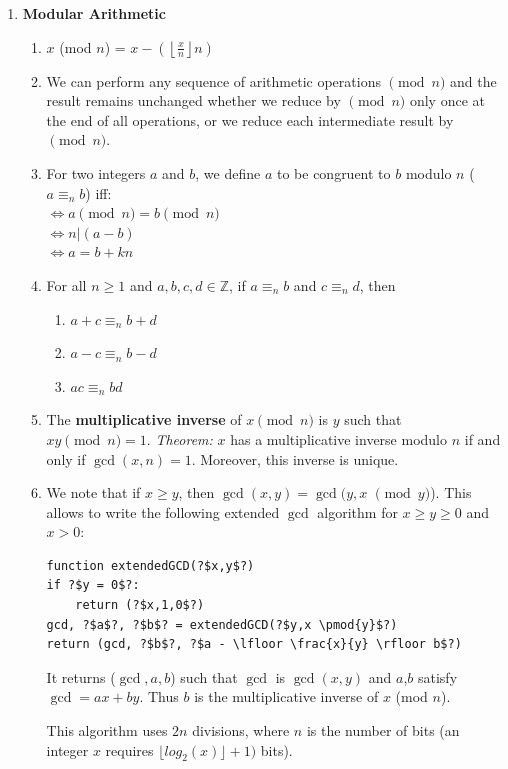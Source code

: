 \documentclass[10pt]{article}
\begin{document}
\begin{multicols}{2}
\begin{enumerate}
    \item \textbf{Modular Arithmetic} 
    \begin{enumerate}
        \item $x$ (mod $n$) = $x - (\left \lfloor{\frac{x}{n}}\right \rfloor n)$
        \item We can perform any sequence of arithmetic operations $\pmod{n}$ and the result remains unchanged whether we reduce by $\pmod{n}$ only once at the end of all operations, or we reduce each intermediate result by $\pmod{n}$.
        \item For two integers $a$ and $b$, we define $a$ to be congruent to $b$ modulo $n$ ($a \equiv_n b$) iff: \\
            $\iff a \pmod{n} = b \pmod{n}$ \\ $\iff n | (a-b)$ \\ $\iff a = b+kn$
        \item For all $n \geq 1$ and $a,b,c,d \in \mathbb{Z}$, if $a \equiv_n b$ and $c \equiv_n d$, then
        \begin{enumerate}
            \item $a + c \equiv_n b + d$
            \item $a - c \equiv_n b - d$
            \item $ac \equiv_n bd$
        \end{enumerate}
        \item The \textbf{multiplicative inverse} of $x \pmod{n}$ is $y$ such that $xy\pmod{n} = 1$. \textit{Theorem:} $x$ has a multiplicative inverse modulo $n$ if and only if $\gcd(x,n)=1$. Moreover, this inverse is unique.
        \item We note that if $x \geq y$, then $\gcd(x,y)=\gcd(y, x$ $\pmod{y}$). This allows to write the following extended $\gcd$ algorithm for $x \geq y \geq 0$ and $x > 0$:
        \begin{verbatim}
function extendedGCD(?$x,y$?)
if ?$y = 0$?:
    return (?$x,1,0$?)
gcd, ?$a$?, ?$b$? = extendedGCD(?$y,x \pmod{y}$?)
return (gcd, ?$b$?, ?$a - \lfloor \frac{x}{y} \rfloor b$?)
        \end{verbatim}
        It returns ($\gcd, a, b$) such that $\gcd$ is $\gcd(x,y)$ and $a$,$b$ satisfy $\gcd = ax + by$. Thus $b$ is the multiplicative inverse of $x$ (mod $n$).
        
        
        This algorithm uses $2n$ divisions, where $n$ is the number of bits (an integer $x$ requires $\lfloor{log_2(x)} \rfloor+1)$ bits).
    \end{enumerate}
    

\end{enumerate}
\end{multicols}
\end{document}
